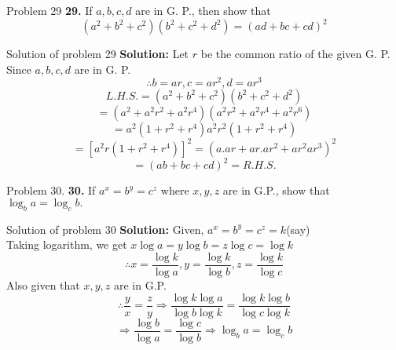 \documentclass[aspectratio=1610,8pt]{beamer}
\begin{document}
\begin{frame}{Problem 29}
  \textbf{29.} If $a,b,c,d$ are in G. P., then show that $$(a^2 + b^2 + c^2)(b^2 + c^2 + d^2) = (ad + bc + cd)^2$$
\end{frame}
\begin{frame}{Solution of problem 29}
  \textbf{Solution:} Let $r$ be the common ratio of the given G. P. Since $a,b,c,d$ are in G. P.
  $$\therefore b = ar, c = ar^2, d = ar^3$$
  $$L.H.S. = (a^2 + b^2 + c^2)(b^2 + c^2 + d^2)$$
  $$= (a^2 + a^2r^2 + a^2r^4)(a^2r^2 + a^2r^4 + a^2r^6)$$
  $$= a^2(1 + r^2 + r^4)a^2r^2(1 + r^2 + r^4)$$
  $$= [a^2r(1 + r^2 + r^4)]^2 = (a.ar + ar.ar^2 + ar^2ar^3)^2$$
  $$= (ab + bc + cd)^2 = R.H.S.$$
\end{frame}
\begin{frame}{Problem 30.}
  \textbf{30.} If $a^x = b^y = c^z$ where $x, y, z$ are in G.P., show that $\log_ba = \log_cb.$
\end{frame}
\begin{frame}{Solution of problem 30}
  \textbf{Solution:} Given, $a^x = b^y = c^z = k$(say)\\
  Taking logarithm, we get $x\log a = y\log b = z\log c = \log k$
  $$\therefore x = \frac{\log k}{\log a}, y = \frac{\log k}{\log b}, z = \frac{\log k}{\log c}$$
  Also given that $x, y, z$ are in G.P.
  $$\therefore \frac{y}{x} = \frac{z}{y} \Rightarrow \frac{\log k\log a}{\log b\log k} = \frac{\log k\log b}{\log c\log k}$$
  $$\Rightarrow \frac{\log b}{\log a} = \frac{\log c}{\log b}\Rightarrow \log_ba = \log_cb$$
\end{frame}
\end{document}

